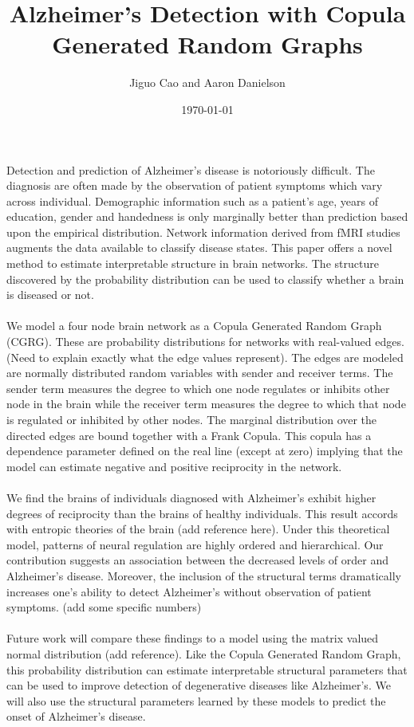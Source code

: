 \documentclass{article}
\begin{document}
\title{Alzheimer's Detection with Copula Generated Random Graphs\\}
\author{Jiguo Cao and Aaron Danielson\\}
\date{\today}
\maketitle
Detection and prediction of Alzheimer's disease is notoriously difficult.  The diagnosis are often made by the observation of patient symptoms which vary across individual.  Demographic information such as a patient's age, years of education, gender and handedness is only marginally better than prediction based upon the empirical distribution.  Network information derived from fMRI studies augments the data available to classify disease states.  This paper offers a novel method to estimate interpretable structure in brain networks.  The structure discovered by the probability distribution can be used to classify whether a brain is diseased or not.
\\ \\
We model a four node brain network as a Copula Generated Random Graph (CGRG).  These are probability distributions for networks with real-valued edges.  (Need to explain exactly what the edge values represent).  The edges are modeled are normally distributed random variables with sender and receiver terms.  The sender term measures the degree to which one node regulates or inhibits other node in the brain while the receiver term measures the degree to which that node is regulated or inhibited by other nodes.  The marginal distribution over the directed edges are bound together with a Frank Copula.  This copula has a dependence parameter defined on the real line (except at zero) implying that the model can estimate negative and positive reciprocity in the network. 
\\ \\
We find the brains of individuals diagnosed with Alzheimer's exhibit higher degrees of reciprocity than the brains of healthy individuals.  This result accords with entropic theories of the brain (add reference here).  Under this theoretical model, patterns of neural regulation are highly ordered and hierarchical.  Our contribution suggests an association between the decreased levels of order and Alzheimer's disease.  Moreover, the inclusion of the structural terms dramatically increases one's ability to detect Alzheimer's without observation of patient symptoms.  (add some specific numbers)
\\ \\
Future work will compare these findings to a model using the matrix valued normal distribution (add reference).  Like the Copula Generated Random Graph, this probability distribution can estimate interpretable structural parameters that can be used to improve detection of degenerative diseases like Alzheimer's.  We will also use the structural parameters learned by these models to predict the onset of Alzheimer's disease.
\end{document}
